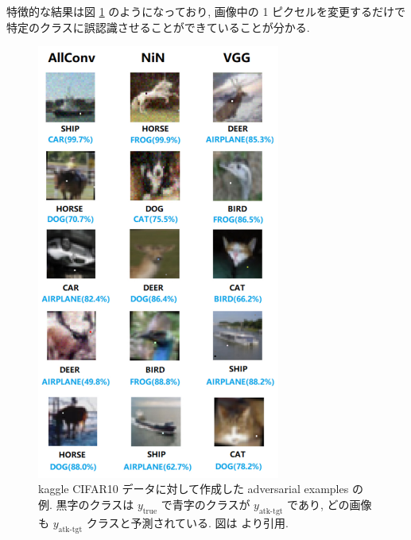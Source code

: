 特徴的な結果は図 \ref{fig:one-pixel-example} のようになっており, 画像中の 1 ピクセルを変更するだけで特定のクラスに誤認識させることができていることが分かる.
%
\begin{figure}[htbp]
\begin{center}
\includegraphics[width=8.0cm]{figures/one-pixel-example.pdf}
\end{center}
\caption{
kaggle CIFAR10 データに対して作成した adversarial examples の例.
黒字のクラスは $y_{\text{true}}$ で青字のクラスが $y_{\text{atk-tgt}}$ であり, どの画像も $y_{\text{atk-tgt}}$ クラスと予測されている.
図は \cite{su2019one} より引用.
}
\label{fig:one-pixel-example}
\end{figure}
%

